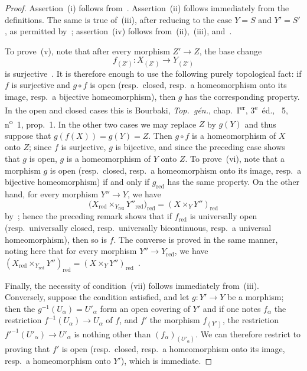 \begin{proof}
Assertion~(i) follows from~.
Assertion~(ii) follows immediately from the definitions. The same is true of~(iii), after reducing to the case $Y=S$ and $Y'=S'$, as permitted by~; assertion~(iv) follows from~(ii),~(iii), and~.

To prove~(v), note that after every morphism $Z'\to Z$, the base change
\[
  f_{(Z')}:X_{(Z')}\longrightarrow Y_{(Z')}
\]
is surjective~. It is therefore enough to use the following
purely topological fact: if $f$ is surjective and $g\circ f$ is open
\textnormal{(}resp.\ closed, resp.\ a
homeomorphism onto its image, resp.\ a bijective homeomorphism\textnormal{)},
then $g$ has the corresponding property. In the open and closed cases this
is Bourbaki, \emph{Top.~g\'{e}n.}, chap.~I\textsuperscript{er},
3\textsuperscript{e}~\'{e}d., \textsection~5, n\textsuperscript{o}~1,
prop.~1. In the other two cases we may replace $Z$ by $g(Y)$ and thus
suppose that $g(f(X))=g(Y)=Z$. Then $g\circ f$ is a homeomorphism of $X$
onto $Z$; since $f$ is surjective, $g$ is bijective, and since the preceding
case shows that $g$ is open, $g$ is a homeomorphism of $Y$ onto $Z$.
To prove~(vi), note that a morphism $g$ is open \textnormal{(}resp.\ closed, resp.\ a homeomorphism onto its image, resp.\ a bijective homeomorphism\textnormal{)} if and only if $g_{\mathrm{red}}$ has the same property.
On the other hand, for every morphism $Y''\to Y$, we have
\[
  \bigl(X_{\mathrm{red}}\times_{Y_{\mathrm{red}}}Y''_{\mathrm{red}}\bigr)_{\mathrm{red}}
  =(X\times_Y Y'')_{\mathrm{red}}
\]
by~; hence the preceding remark shows that if $f_{\mathrm{red}}$ is universally open \textnormal{(}resp.\ universally closed, resp.\ universally bicontinuous, resp.\ a universal homeomorphism\textnormal{)}, then so is $f$.
The converse is proved in the same manner, noting here that for every morphism $Y''\to Y_{\mathrm{red}}$, we have $(X_{\mathrm{red}}\times_{Y_{\mathrm{red}}}Y'')_{\mathrm{red}}=(X\times_Y Y'')_{\mathrm{red}}$~.

Finally, the necessity of condition~(vii) follows immediately from~(iii).
Conversely, suppose the condition satisfied, and let $g:Y'\to Y$ be a morphism; then the $g^{-1}(U_\alpha)=U'_\alpha$ form an open covering of $Y'$ and if one notes $f_\alpha$ the restriction $f^{-1}(U_\alpha)\to U_\alpha$ of $f$, and $f'$ the morphism $f_{(Y')}$, the restriction $f'^{-1}(U'_\alpha)\to U'_\alpha$ is nothing other than $(f_\alpha)_{(U'_\alpha)}$.
We can therefore restrict to proving that $f'$ is open \textnormal{(}resp.\ closed, resp.\ a homeomorphism onto its image, resp.\ a homeomorphism onto $Y'$\textnormal{)}, which is immediate.
\end{proof}

